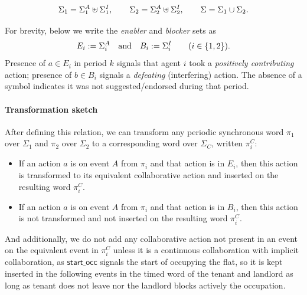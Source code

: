 \documentclass{article}
\begin{document}
  \[
  \Sigma_{1}=\Sigma^{A}_{1}\uplus\Sigma^{I}_{1},\qquad
  \Sigma_{2}=\Sigma^{A}_{2}\uplus\Sigma^{I}_{2},\qquad
  \Sigma=\Sigma_{1}\cup\Sigma_{2}.
  \]
  
  For brevity, below we write the \emph{enabler} and \emph{blocker} sets as
  \[
  E_i:=\Sigma^{A}_{i}\quad\text{and}\quad B_i:=\Sigma^{I}_{i}\qquad(i\in\{1,2\}).
  \]
  Presence of \(a\in E_i\) in period \(k\) signals that agent \(i\) took a
  \emph{positively contributing} action; presence of \(b\in B_i\) signals a
  \emph{defeating} (interfering) action. The absence of a symbol indicates it was not suggested/endorsed during that period.
  
  
  \paragraph{Transformation sketch} After defining this relation, we can transform any periodic synchronous word  $\pi_1$ over $\Sigma_1$ and $\pi_2$ over  $\Sigma_2$ to a corresponding word over $\Sigma_C$, written $\pi_i^C$:
  \begin{itemize}
  \item If an action $a$ is on event $A$ from $\pi_i$ and that action is in $E_i$, then this action is transformed to its equivalent collaborative action and inserted on the resulting word $\pi_i^C$.
  \item If an action $a$ is on event $A$ from $\pi_i$ and that action is in $B_i$, then this action is not transformed and not inserted on the resulting word $\pi_i^C$.
  \end{itemize}
  And additionally, we do not add any collaborative action not present in an event on the equivalent event in $\pi_i^C$ unless it is a continuous collaboration with implicit collaboration, as $\textsf{start\_occ}$ signals the start of occupying the flat, so it is kept inserted in the following events in the timed word of the tenant and landlord as long as tenant does not leave nor the landlord blocks actively the occupation.
  
  
  
\end{document}
